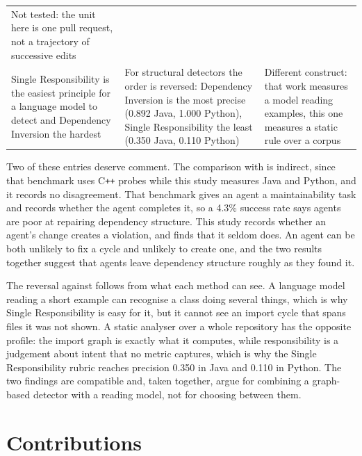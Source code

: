\begin{table}[p]
\begin{tabular}{@{}>{\raggedright\arraybackslash}p{3.5cm}
                  >{\raggedright\arraybackslash}p{4.6cm}
                  >{\raggedright\arraybackslash}p{4.9cm}@{}}
Not tested: the unit here is one pull request, not a trajectory of successive edits \\
\addlinespace
Single Responsibility is the easiest principle for a language model to detect and Dependency
Inversion the hardest \citep{pehlivan2025solid} &
For structural detectors the order is reversed: Dependency Inversion is the most precise
(0.892 Java, 1.000 Python), Single Responsibility the least (0.350 Java, 0.110 Python) &
Different construct: that work measures a model reading examples, this one measures a static rule
over a corpus \\
\bottomrule
\end{tabular}
\end{table}

Two of these entries deserve comment. The comparison with \citet{zhu2026nitr} is indirect, since
that benchmark uses C\texttt{++} probes while this study measures Java and Python, and it records no
disagreement. That benchmark gives an agent a maintainability task and records whether the agent
completes it, so a 4.3\% success rate says agents are poor at repairing dependency structure. This
study records whether an agent's change creates a violation, and finds that it seldom does. An agent
can be both unlikely to fix a cycle and unlikely to create one, and the two results together suggest
that agents leave dependency structure roughly as they found it.

The reversal against \citet{pehlivan2025solid} follows from what each method can see. A language
model reading a short example can recognise a class doing several things, which is why Single
Responsibility is easy for it, but it cannot see an import cycle that spans files it was not shown.
A static analyser over a whole repository has the opposite profile: the import graph is exactly what
it computes, while responsibility is a judgement about intent that no metric captures, which is why
the Single Responsibility rubric reaches precision 0.350 in Java and 0.110 in Python. The two
findings are compatible and, taken together, argue for combining a graph-based detector with a
reading model, not for choosing between them.

\section{Contributions}
\label{sec:contributions}

